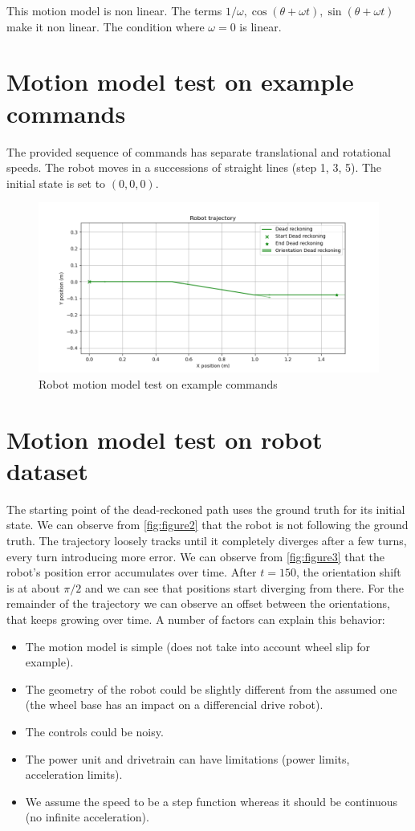 \documentclass{article}
\begin{document}
This motion model is non linear. The terms $1/\omega, \cos(\theta+\omega t), \sin(\theta+\omega t)$ make it non linear. The  condition where $\omega=0$ is linear.

\section{Motion model test on example commands}
The provided sequence of commands has separate translational and rotational speeds. The robot moves in a successions of straight lines (step 1, 3, 5). The initial state is set to $(0,0,0)$.

\begin{figure}
\centering
\includegraphics[scale=0.3]{Figure_1.png}
\caption{Robot motion model test on example commands}
\label{fig:figure1}
\end{figure}

\section{Motion model test on robot dataset}
The starting point of the dead-reckoned path uses the ground truth for its initial state. We can observe from \autoref{fig:figure2} that the robot is not following the ground truth. The trajectory loosely tracks until it completely diverges after a few turns, every turn introducing more error. We can observe from \autoref{fig:figure3} that the robot's position error accumulates over time. After $t=150$, the orientation shift is at about $\pi/2$ and we can see that positions start diverging from there. For the remainder of the trajectory we can observe an offset between the orientations, that keeps growing over time.
A number of factors can explain this behavior:
\begin{itemize}
      \item The motion model is simple (does not take into account wheel slip for example).
      \item The geometry of the robot could be slightly different from the assumed one (the wheel base has an impact on a differencial drive robot).
      \item The controls could be noisy.
      \item The power unit and drivetrain can have limitations (power limits, acceleration limits).
      \item We assume the speed to be a step function whereas it should be continuous (no infinite acceleration).

\end{itemize}
\end{document}
